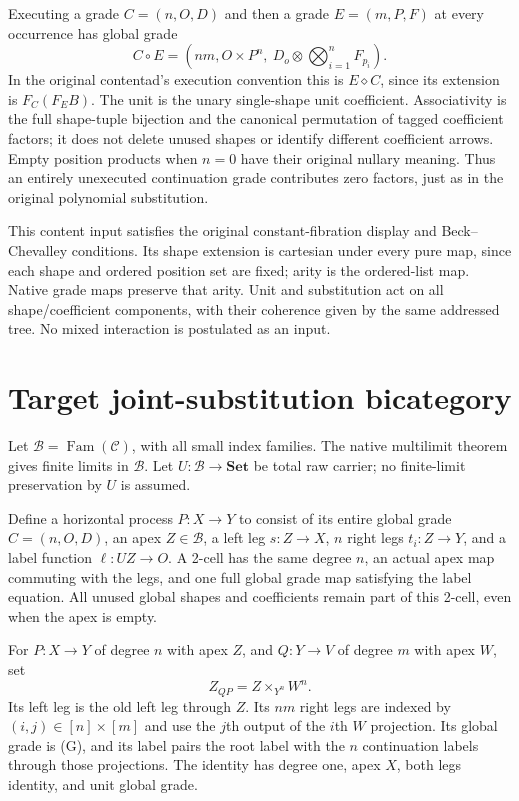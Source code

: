 \documentclass[11pt]{article}
\newcommand{\B}{\mathcal B}\newcommand{\E}{\mathcal E}\newcommand{\D}{\mathcal D}
\begin{document}
Executing a grade $C=(n,O,D)$ and then a grade $E=(m,P,F)$ at every occurrence has global grade
\[
 C\circ E=(nm,O\times P^n,\ D_o\otimes\bigotimes_{i=1}^n F_{p_i}). \tag{G}
\]
In the original contentad's execution convention this is $E\diamond C$, since its extension is $F_C(F_E B)$. The unit is the unary single-shape unit coefficient. Associativity is the full shape-tuple bijection and the canonical permutation of tagged coefficient factors; it does not delete unused shapes or identify different coefficient arrows. Empty position products when $n=0$ have their original nullary meaning. Thus an entirely unexecuted continuation grade contributes zero factors, just as in the original polynomial substitution.

This content input satisfies the original constant-fibration display and Beck--Chevalley conditions. Its shape extension is cartesian under every pure map, since each shape and ordered position set are fixed; arity is the ordered-list map. Native grade maps preserve that arity. Unit and substitution act on all shape/coefficient components, with their coherence given by the same addressed tree. No mixed interaction is postulated as an input.

\section{Target joint-substitution bicategory}
Let $\B=\operatorname{Fam}(\mathcal C)$, with all small index families. The native multilimit theorem gives finite limits in $\B$. Let $U:\B\to\mathbf{Set}$ be total raw carrier; no finite-limit preservation by $U$ is assumed.

Define a horizontal process $P:X\to Y$ to consist of its entire global grade $C=(n,O,D)$, an apex $Z\in\B$, a left leg $s:Z\to X$, $n$ right legs $t_i:Z\to Y$, and a label function $\ell:UZ\to O$. A 2-cell has the same degree $n$, an actual apex map commuting with the legs, and one full global grade map satisfying the label equation. All unused global shapes and coefficients remain part of this 2-cell, even when the apex is empty.

For $P:X\to Y$ of degree $n$ with apex $Z$, and $Q:Y\to V$ of degree $m$ with apex $W$, set
\[
 Z_{QP}=Z\times_{Y^n}W^n. \tag{C}
\]
Its left leg is the old left leg through $Z$. Its $nm$ right legs are indexed by $(i,j)\in[n]\times[m]$ and use the $j$th output of the $i$th $W$ projection. Its global grade is (G), and its label pairs the root label with the $n$ continuation labels through those projections. The identity has degree one, apex $X$, both legs identity, and unit global grade.
\end{document}
